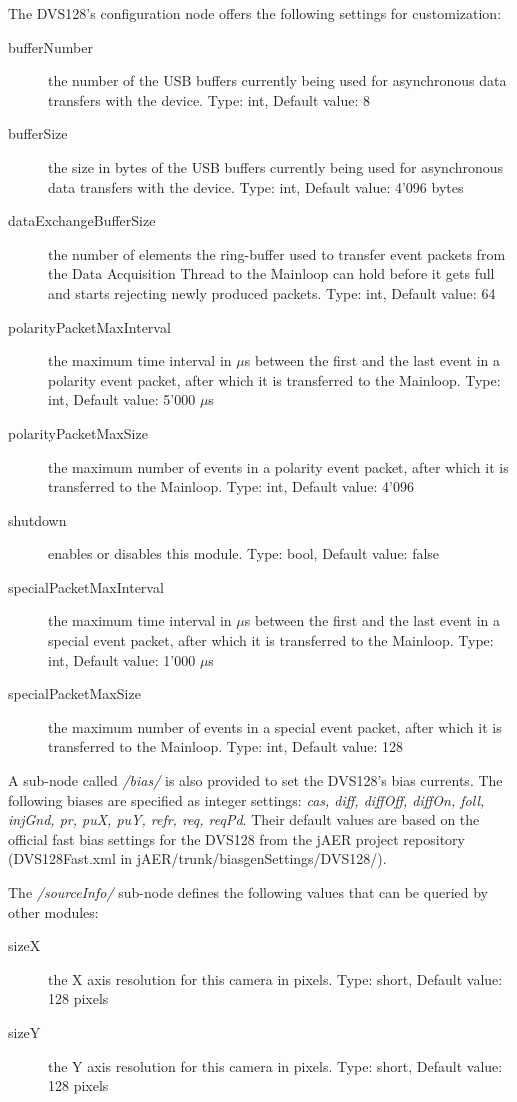 \documentclass[a4paper,12pt]{report}
\begin{document}
The DVS128's configuration node offers the following settings for customization:
\begin{description}
\item[bufferNumber] the number of the USB buffers currently being used for asynchronous data transfers with the device.
\subitem Type: int, Default value: 8
\item[bufferSize] the size in bytes of the USB buffers currently being used for asynchronous data transfers with the device.
\subitem Type: int, Default value: 4'096 bytes
\item[dataExchangeBufferSize] the number of elements the ring-buffer used to transfer event packets from the Data Acquisition Thread to the Mainloop can hold before it gets full and starts rejecting newly produced packets.
\subitem Type: int, Default value: 64
\item[polarityPacketMaxInterval] the maximum time interval in $\mu$s between the first and the last event in a polarity event packet, after which it is transferred to the Mainloop.
\subitem Type: int, Default value: 5'000 $\mu$s
\item[polarityPacketMaxSize]  the maximum number of events in a polarity event packet, after which it is transferred to the Mainloop.
\subitem Type: int, Default value: 4'096
\item[shutdown] enables or disables this module.
\subitem Type: bool, Default value: false
\item[specialPacketMaxInterval] the maximum time interval in $\mu$s between the first and the last event in a special event packet, after which it is transferred to the Mainloop.
\subitem Type: int, Default value: 1'000 $\mu$s
\item[specialPacketMaxSize] the maximum number of events in a special event packet, after which it is transferred to the Mainloop.
\subitem Type: int, Default value: 128
\end{description}

A sub-node called \emph{/bias/} is also provided to set the DVS128's bias currents.
The following biases are specified as integer settings: \emph{cas, diff, diffOff, diffOn, foll, injGnd, pr, puX, puY, refr, req, reqPd}. Their default values are based on the official fast bias settings for the DVS128 from the jAER project \cite{jaer_project} repository (DVS128Fast.xml in jAER/trunk/biasgenSettings/DVS128/).

The \emph{/sourceInfo/} sub-node defines the following values that can be queried by other modules:
\begin{description}
\item[sizeX] the X axis resolution for this camera in pixels.
\subitem Type: short, Default value: 128 pixels
\item[sizeY] the Y axis resolution for this camera in pixels.
\subitem Type: short, Default value: 128 pixels
\end{description}
\end{document}
